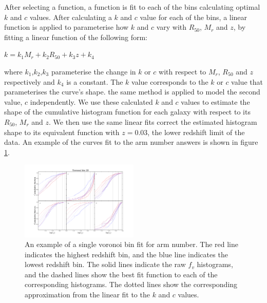 \documentclass[useAMS,usenatbib]{mn2e}
\begin{document}
After selecting a function, a function is fit to each of the bins calculating optimal $k$ and $c$ values. After calculating a $k$ and $c$ value for each of the bins, a linear function is applied to parameterise how $k$ and $c$ vary with $R_{50}$, $M_r$ and $z$, by fitting a linear function of the following form:

\begin{center}
$k = k_1M_r + k_2R_{50} +k_3z + k_4$
\end{center}

where $k_1$,$k_2$,$k_3$ parameterise the change in $k$ or $c$ with respect to $M_r$, $R_{50}$ and $z$ respectively and $k_4$ is a constant. The $k$ value corresponds to the $k$ or $c$ value that parameterises the curve's shape. the same method is applied to model the second value, $c$ independently. We use these calculated $k$ and $c$ values to estimate the shape of the cumulative histogram function for each galaxy with respect to its $R_{50}$, $M_r$ and $z$. We then use the same linear fits  correct the estimated histogram shape to its equivalent function with $z=0.03$, the lower redshift limit of the data. An example of the curves fit to the arm number answers is shown in figure \ref{fig:function_fit}. 

\begin{figure}
		\centering
		
        \includegraphics[width=0.5\textwidth]{Data_imgs/fit_t11_arms_number_vbin20_kcfit1.pdf}
		
        \caption{An example of a single voronoi bin fit for arm number. The red line indicates the highest redshift bin, and the blue line indicates the lowest redshift bin. The solid lines indicate the raw $f_v$ histograms, and the dashed lines show the best fit function to each of the corresponding histograms. The dotted lines show the corresponding approximation from the linear fit to the $k$ and $c$ values.}
		
        \label{fig:function_fit}
        
\end{figure}
\end{document}

